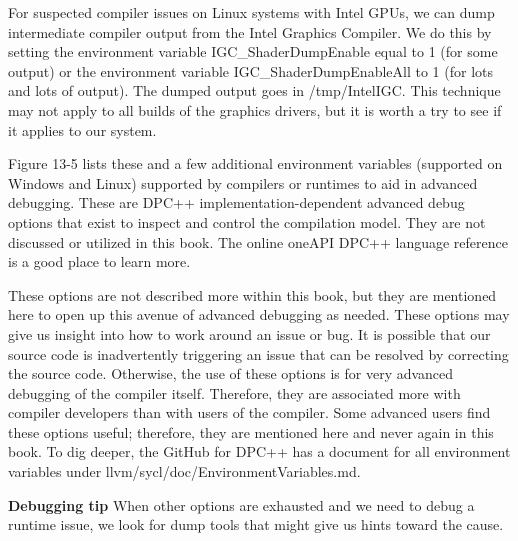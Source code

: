 For suspected compiler issues on Linux systems with Intel GPUs, we can dump intermediate compiler output from the Intel Graphics Compiler. We do this by setting the environment variable IGC\_ShaderDumpEnable equal to 1 (for some output) or the environment variable IGC\_ShaderDumpEnableAll to 1 (for lots and lots of output). The dumped output goes in /tmp/IntelIGC. This technique may not apply to all builds of the graphics drivers, but it is worth a try to see if it applies to our system.\par

Figure 13-5 lists these and a few additional environment variables (supported on Windows and Linux) supported by compilers or runtimes to aid in advanced debugging. These are DPC++ implementation-dependent advanced debug options that exist to inspect and control the compilation model. They are not discussed or utilized in this book. The online oneAPI DPC++ language reference is a good place to learn more.\par

These options are not described more within this book, but they are mentioned here to open up this avenue of advanced debugging as needed. These options may give us insight into how to work around an issue or bug. It is possible that our source code is inadvertently triggering an issue that can be resolved by correcting the source code. Otherwise, the use of these options is for very advanced debugging of the compiler itself. Therefore, they are associated more with compiler developers than with users of the compiler. Some advanced users find these options useful; therefore, they are mentioned here and never again in this book. To dig deeper, the GitHub for DPC++ has a document for all environment variables under llvm/sycl/doc/EnvironmentVariables.md.\par

\begin{tcolorbox}[colback=red!5!white,colframe=red!75!black]
\textbf{Debugging tip} When other options are exhausted and we need to debug a runtime issue, we look for dump tools that might give us hints toward the cause.
\end{tcolorbox}

